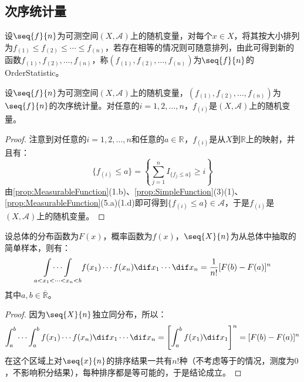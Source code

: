 \subsection{次序统计量}
\begin{definition}
	设$\seq{f}{n}$为可测空间$(X,\mathscr{A})$上的随机变量，对每个$x\in X$，将其按大小排列为$f_{(1)}\leqslant f_{(2)}\leqslant\cdots\leqslant f_{(n)}$，若存在相等的情况则可随意排列，由此可得到新的函数$f_{(1)},f_{(2)},\dots,f_{(n)}$，称$(f_{(1)},f_{(2)},\dots,f_{(n)})$为$\seq{f}{n}$的\gls{OrderStatistic}。
\end{definition}
\begin{property}\label{prop:OrderStatistics}
	设$\seq{f}{n}$为可测空间$(X,\mathscr{A})$上的随机变量，$(f_{(1)},f_{(2)},\dots,f_{(n)})$为$\seq{f}{n}$的次序统计量。对任意的$i=1,2,\dots,n$，$f_{(i)}$是$(X,\mathscr{A})$上的随机变量。
\end{property}
\begin{proof}
	注意到对任意的$i=1,2,\dots,n$和任意的$a\in\mathbb{R}^{}$，$f_{(i)}$是从$X$到$\mathbb{R}$上的映射，并且有：
	\begin{equation*}
		\{f_{(i)}\leqslant a\}=\left\{\sum_{j=1}^{n}I_{\{f_j\leqslant a\}}\geqslant i\right\}
	\end{equation*}
	由\cref{prop:MeasurableFunction}(1.b)、\cref{prop:SimpleFunction}(3)(1)、\cref{prop:MeasurableFunction}(5.a)(1.d)即可得到$\{f_{(i)}\leqslant a\}\in\mathscr{A}$，于是$f_{(i)}$是$(X,\mathscr{A})$上的随机变量。
\end{proof}
\begin{lemma}\label{lem:OrderStatistics}
	设总体的分布函数为$F(x)$，概率函数为$f(x)$，$\seq{X}{n}$为从总体中抽取的简单样本，则有：
	\begin{equation*}
		\underset{a<x_1<\cdots<x_n<b}{\int\cdots\int}f(x_1)\cdots f(x_n)\dif x_1\cdots\dif x_n=\frac{1}{n!}[F(b)-F(a)]^n
	\end{equation*}
	其中$a,b\in\overline{\mathbb{R}}$。
\end{lemma}
\begin{proof}
	因为$\seq{X}{n}$独立同分布，所以：
	\begin{equation*}
		\int_{a}^{b}\cdots\int_{a}^{b}f(x_1)\cdots f(x_n)\dif x_1\cdots\dif x_n=\left[\int_{a}^{b}f(x_1)\dif x_1\right]^n=[F(b)-F(a)]^n
	\end{equation*}
	在这个区域上对$\seq{x}{n}$的排序结果一共有$n!$种（不考虑等于的情况，测度为$0$，不影响积分结果），每种排序都是等可能的，于是结论成立。
\end{proof}
